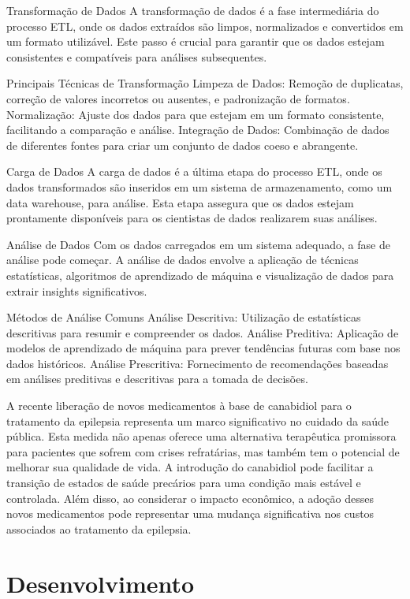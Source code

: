 \documentclass[article,a4paper,12pt,brazil,sumario=tradicional]{abntex2}
\begin{document}
Transformação de Dados
A transformação de dados é a fase intermediária do processo ETL, onde os dados extraídos são limpos, normalizados e convertidos em um formato utilizável. Este passo é crucial para garantir que os dados estejam consistentes e compatíveis para análises subsequentes.

Principais Técnicas de Transformação
Limpeza de Dados: Remoção de duplicatas, correção de valores incorretos ou ausentes, e padronização de formatos.
Normalização: Ajuste dos dados para que estejam em um formato consistente, facilitando a comparação e análise.
Integração de Dados: Combinação de dados de diferentes fontes para criar um conjunto de dados coeso e abrangente.

Carga de Dados
A carga de dados é a última etapa do processo ETL, onde os dados transformados são inseridos em um sistema de armazenamento, como um data warehouse, para análise. Esta etapa assegura que os dados estejam prontamente disponíveis para os cientistas de dados realizarem suas análises.

Análise de Dados
Com os dados carregados em um sistema adequado, a fase de análise pode começar. A análise de dados envolve a aplicação de técnicas estatísticas, algoritmos de aprendizado de máquina e visualização de dados para extrair insights significativos.

Métodos de Análise Comuns
Análise Descritiva: Utilização de estatísticas descritivas para resumir e compreender os dados.
Análise Preditiva: Aplicação de modelos de aprendizado de máquina para prever tendências futuras com base nos dados históricos.
Análise Prescritiva: Fornecimento de recomendações baseadas em análises preditivas e descritivas para a tomada de decisões.

A recente liberação de novos medicamentos à base de canabidiol para o tratamento da epilepsia representa um marco significativo no cuidado da saúde pública. Esta medida não apenas oferece uma alternativa terapêutica promissora para pacientes que sofrem com crises refratárias, mas também tem o potencial de melhorar sua qualidade de vida. A introdução do canabidiol pode facilitar a transição de estados de saúde precários para uma condição mais estável e controlada. Além disso, ao considerar o impacto econômico, a adoção desses novos medicamentos pode representar uma mudança significativa nos custos associados ao tratamento da epilepsia.

\section{Desenvolvimento}
\end{document}
